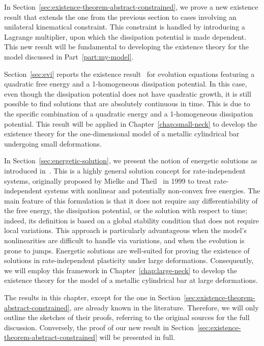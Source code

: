 \documentclass[a4paper,10pt,twoside]{amsbook}
\numberwithin{section}{chapter}
\numberwithin{equation}{chapter}
\theoremstyle{definition}
\begin{document}
In Section~\ref{sec:existence-theorem-abstract-constrained}, we prove a new existence result that extends the one from the previous section to cases involving an unilateral kinematical constraint. This constraint is handled by introducing a Lagrange multiplier, upon which the dissipation potential is made dependent. This new result will be fundamental to developing the existence theory for the model discussed in Part~\ref{part:my-model}.

Section~\ref{sec:evi} reports the existence result~\cite[Theorem 7.3]{han-reddy} for evolution equations featuring a quadratic free energy and a 1-homogeneous dissipation potential. In this case, even though the dissipation potential does not have quadratic growth, it is still possible to find solutions that are absolutely continuous in time. This is due to the specific combination of a quadratic energy and a 1-homogeneous dissipation potential. This result will be applied in Chapter~\ref{chap:small-neck} to develop the existence theory for the one-dimensional model of a metallic cylindrical bar undergoing small deformations.

In Section~\ref{sec:energetic-solution}, we present the notion of energetic solutions as introduced in~\cite{francfort,rate-independent-systems}. This is a highly general solution concept for rate-independent systems, originally proposed by Mielke and Theil~\cite{mielke1999mathematical} in 1999 to treat rate-independent systems with nonlinear and potentially non-convex free energies. The main feature of this formulation is that it does not require any differentiability of the free energy, the dissipation potential, or the solution with respect to time; indeed, its definition is based on a global stability condition that does not require local variations. This approach is particularly advantageous when the model's nonlinearities are difficult to handle via variations, and when the evolution is prone to jumps. Energetic solutions are well-suited for proving the existence of solutions in rate-independent plasticity under large deformations. Consequently, we will employ this framework in Chapter~\ref{chap:large-neck} to develop the existence theory for the model of a metallic cylindrical bar at large deformations.

The results in this chapter, except for the one in Section~\ref{sec:existence-theorem-abstract-constrained}, are already known in the literature. Therefore, we will only outline the sketches of their proofs, referring to the original sources for the full discussion. Conversely, the proof of our new result in Section~\ref{sec:existence-theorem-abstract-constrained} will be presented in full.
\end{document}
